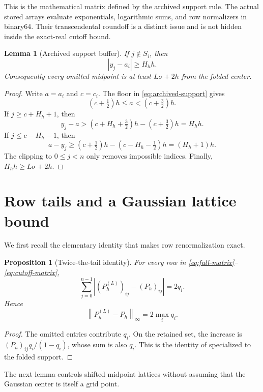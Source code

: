 \documentclass[11pt]{article}
\newtheorem{proposition}[theorem]{Proposition}
\newtheorem{lemma}[theorem]{Lemma}
\theoremstyle{definition}
\theoremstyle{remark}
\newcommand{\norm}[1]{\left\lVert #1\right\rVert}
\begin{document}
This is the mathematical matrix defined by the archived support rule.  The
actual stored arrays evaluate exponentials, logarithmic sums, and row
normalizers in binary64.  Their transcendental roundoff is a distinct issue
and is not hidden inside the exact-real cutoff bound.

\begin{lemma}[Archived support buffer]
\label{lem:support-buffer}
If $j\notin S_i$, then
\begin{equation}
|y_j-a_i|\ge H_hh.
\label{eq:support-buffer}
\end{equation}
Consequently every omitted midpoint is at least
$L\sigma+2h$ from the folded center.
\end{lemma}

\begin{proof}
Write $a=a_i$ and $c=c_i$.  The floor in
\eqref{eq:archived-support} gives
\[
(c+\tfrac12)h\le a<(c+\tfrac32)h.
\]
If $j\ge c+H_h+1$, then
\[
y_j-a>(c+H_h+\tfrac32)h-(c+\tfrac32)h=H_hh.
\]
If $j\le c-H_h-1$, then
\[
a-y_j\ge(c+\tfrac12)h-(c-H_h-\tfrac12)h
=(H_h+1)h.
\]
The clipping to $0\le j<n$ only removes impossible indices.  Finally,
$H_hh\ge L\sigma+2h$.
\end{proof}

\section{Row tails and a Gaussian lattice bound}
\label{sec:tails}

We first recall the elementary identity that makes row renormalization exact.

\begin{proposition}[Twice-the-tail identity]
\label{prop:twice-tail}
For every row in \eqref{eq:full-matrix}--\eqref{eq:cutoff-matrix},
\begin{equation}
\sum_{j=0}^{n-1}|(P_h^{(L)})_{ij}-(P_h)_{ij}|=2q_i.
\label{eq:twice-tail}
\end{equation}
Hence
\[
\norm{P_h^{(L)}-P_h}_\infty=2\max_iq_i.
\]
\end{proposition}

\begin{proof}
The omitted entries contribute $q_i$.  On the retained set, the increase is
$(P_h)_{ij}q_i/(1-q_i)$, whose sum is also $q_i$.  This is the identity of
\citet{WangResponse2026} specialized to the folded support.
\end{proof}

The next lemma controls shifted midpoint lattices without assuming that the
Gaussian center is itself a grid point.
\end{document}
